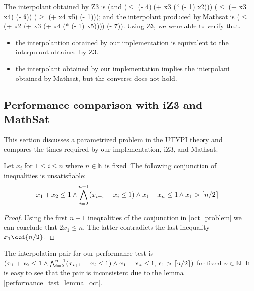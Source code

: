 

The interpolant obtained by Z3 is 
 (and ($\leq$ (- 4) (+ x3 (* (- 1) x2))) ($\leq$ (+ x3 x4) (- 6)) ($\geq$ (+ x4 x5) (- 1))); 
 and the interpolant produced by Mathsat is ($\leq$ (+ x2 (+ x3 (+ x4 (* (- 1) x5)))) (- 7)).
 Using Z3, we were able to verify that: 
 \begin{itemize}
 \item the interpolantion obtained by our implementation
 is equivalent to the interpolant obtained by Z3. 
 \item the interpolant obtained by our implementation implies the interpolant
 obtained by Mathsat, but the converse does not hold.
 \end{itemize}



\subsection{Performance comparison with iZ3 and MathSat}\label{performance_oct}

This section discusses a parametrized problem 
in the UTVPI theory and compares the times required by
our implementation, iZ3, and Mathsat.

\begin{lemma} \label{performance_test_lemma_oct}
  Let $x_i$ for $1 \leq i \leq n$ where $n \in \mathbb{N}$ is fixed.
  The following conjunction of inequalities is unsatisfiable:
  \begin{equation*}\label{oct_problem}
    x_1 + x_2 \leq 1 
    \land \bigwedge_{i=2}^{n-1} (x_{i+1} - x_i \leq 1) 
    \land x_1 - x_n \leq 1
    \land x_1 > \ceil{n/2}
  \end{equation*}
\end{lemma}

\begin{proof}
  Using the first $n-1$ inequalities of the conjunction
  in \ref{oct_problem} we can conclude that $2x_1 \leq n$.
  The latter contradicts the last inequality $x_1 \cei{n/2}$.
\end{proof}

The interpolation pair for our performance test 
is $(x_1 + x_2 \leq 1 
    \land \bigwedge_{i=2}^{n-1} (x_{i+1} - x_i \leq 1) 
    \land x_1 - x_n \leq 1, x_1 > \lceil n/2\rceil)$
for fixed $n \in \mathbb{N}$.
It is easy to see that the pair is inconsistent due to the lemma 
\ref{performance_test_lemma_oct}. 

